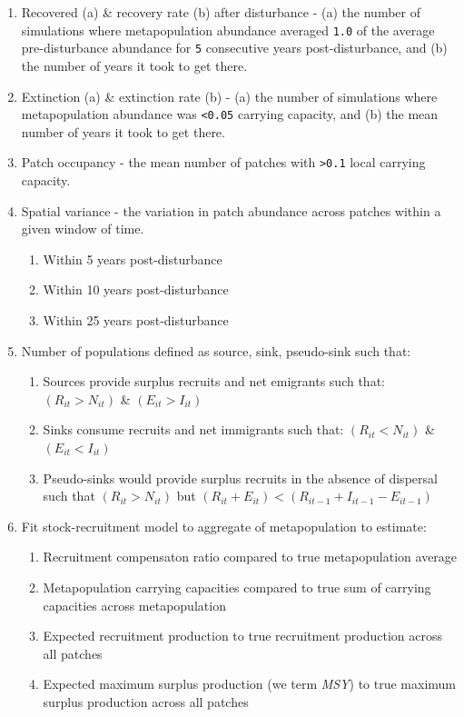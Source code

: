 \documentclass[]{article}
\providecommand{\tightlist}{%
  \setlength{\itemsep}{0pt}\setlength{\parskip}{0pt}}
\begin{document}
\begin{enumerate}
\def\labelenumi{\arabic{enumi}.}
\item
  Recovered (a) \& recovery rate (b) after disturbance - (a) the number
  of simulations where metapopulation abundance averaged \texttt{1.0} of
  the average pre-disturbance abundance for \texttt{5} consecutive years
  post-disturbance, and (b) the number of years it took to get there.
\item
  Extinction (a) \& extinction rate (b) - (a) the number of simulations
  where metapopulation abundance was \texttt{\textless{}0.05} carrying
  capacity, and (b) the mean number of years it took to get there.
\item
  Patch occupancy - the mean number of patches with
  \texttt{\textgreater{}0.1} local carrying capacity.
\item
  Spatial variance - the variation in patch abundance across patches
  within a given window of time.

  \begin{enumerate}
  \def\labelenumii{\alph{enumii}.}
  \tightlist
  \item
    Within 5 years post-disturbance
  \item
    Within 10 years post-disturbance
  \item
    Within 25 years post-disturbance
  \end{enumerate}
\item
  Number of populations defined as source, sink, pseudo-sink such that:

  \begin{enumerate}
  \def\labelenumii{\alph{enumii}.}
  \tightlist
  \item
    Sources provide surplus recruits and net emigrants such that:
    \((R_{it}>N_{it})\) \& \((E_{it}>I_{it})\)
  \item
    Sinks consume recruits and net immigrants such that:
    \((R_{it} < N_{it})\) \& \((E_{it} < I_{it})\)
  \item
    Pseudo-sinks would provide surplus recruits in the absence of
    dispersal such that \((R_{it}>N_{it})\) but
    \((R_{it}+E_{it}) < (R_{it-1}+I_{it-1}-E_{it-1})\)
  \end{enumerate}
\item
  Fit stock-recruitment model to aggregate of metapopulation to
  estimate:

  \begin{enumerate}
  \def\labelenumii{\alph{enumii}.}
  \tightlist
  \item
    Recruitment compensaton ratio compared to true metapopulation
    average
  \item
    Metapopulation carrying capacities compared to true sum of carrying
    capacities across metapopulation
  \item
    Expected recruitment production to true recruitment production
    across all patches
  \item
    Expected maximum surplus production (we term \emph{MSY}) to true
    maximum surplus production across all patches
  \end{enumerate}
\end{enumerate}
\end{document}
